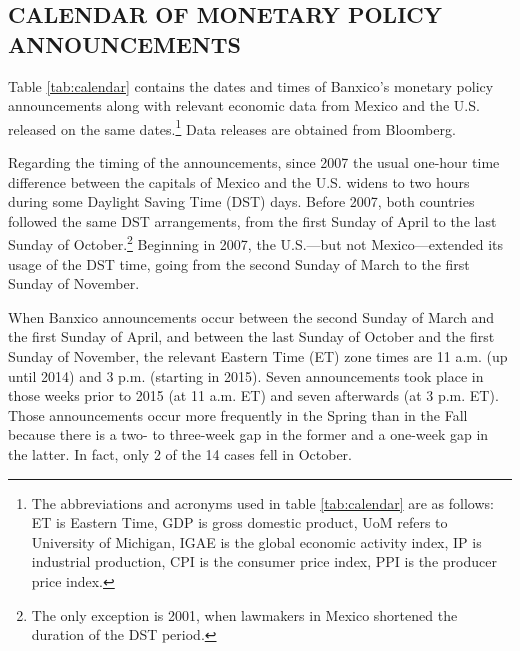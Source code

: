 \documentclass[a4paper,12pt]{article} 		%
\begin{document}
\newpage
\begin{appendices}

\titleformat{\section}{\large\bfseries}{}{0pt}{\appendixname\quad\thesection:\quad}
\setcounter{footnote}{0}
\renewcommand{\thetable}{\thesection\arabic{table}}
\renewcommand\thefigure{\thesection\arabic{figure}}
\renewcommand{\theequation}{\thesection\arabic{equation}}


\section{CALENDAR OF MONETARY POLICY ANNOUNCEMENTS} \label{sec:calendar}
\sectitlespace

Table \ref{tab:calendar} contains the dates and times of Banxico's monetary policy announcements along with relevant economic data from Mexico and the U.S. released on the same dates.\footnote{ The abbreviations and acronyms used in table \ref{tab:calendar} are as follows: ET is Eastern Time, GDP is gross domestic product, UoM refers to University of Michigan, IGAE is the global economic activity index, IP is industrial production, CPI is the consumer price index, PPI is the producer price index.} Data releases are obtained from Bloomberg. 

Regarding the timing of the announcements, since 2007 the usual one-hour time difference between the capitals of Mexico and the U.S. widens to two hours during some Daylight Saving Time (DST) days. Before 2007, both countries followed the same DST arrangements, from the first Sunday of April to the last Sunday of October.\footnote{ The only exception is 2001, when lawmakers in Mexico shortened the duration of the DST period.} Beginning in 2007, the U.S.---but not Mexico---extended its usage of the DST time, going from the second Sunday of March to the first Sunday of November.

When Banxico announcements occur between the second Sunday of March and the first Sunday of April, and between the last Sunday of October and the first Sunday of November, the relevant Eastern Time (ET) zone times are 11 a.m. (up until 2014) and 3 p.m. (starting in 2015). Seven announcements took place in those weeks prior to 2015 (at 11 a.m. ET) and seven afterwards (at 3 p.m. ET). Those announcements occur more frequently in the Spring than in the Fall because there is a two- to three-week gap in the former and a one-week gap in the latter. In fact, only 2 of the 14 cases fell in October.


\end{appendices}
\end{document}
